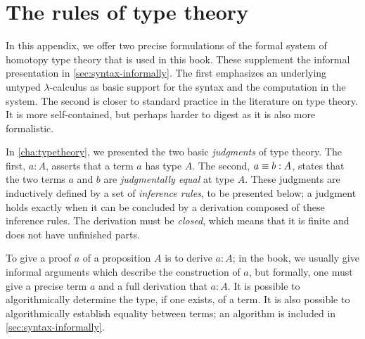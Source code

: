\chapter{The rules of type theory}
\label{cha:rules}


\newcommand{\emptyctx}{\ensuremath{\cdot}}
\newcommand{\production}{\vcentcolon\vcentcolon=}
\newcommand{\conv}{\sim}
\newcommand{\ctx}{\ensuremath{\mathsf{ctx}}}
\newcommand{\wfctx}[1]{\vdash #1\ \ctx}
\newcommand{\oftp}[3]{#1 \vdash #2 : #3}
\newcommand{\jdeqtp}[4]{#1 \vdash #2 \jdeq #3 : #4}
\newcommand{\judg}[2]{#1 \vdash #2}
\newcommand{\tmtp}[2]{#1 \mathord{:} #2}

\newcommand{\form}{\textsc{form}}
\newcommand{\intro}{\textsc{intro}}
\newcommand{\elim}{\textsc{elim}}
\newcommand{\comp}{\textsc{comp}}
\newcommand{\Weak}{\mathsf{Wkg}}
\newcommand{\Vble}{\mathsf{Vble}}
\newcommand{\Exch}{\mathsf{Exch}}
\newcommand{\Subst}{\mathsf{Subst}}

In this appendix, we offer two precise
formulations of the formal system of homotopy type theory that is used
in this book. These supplement the informal presentation in \autoref{sec:syntax-informally}.
The first emphasizes an underlying untyped $\lambda$-calculus as basic
support for the syntax and the computation in the system.
The second is closer to standard practice in the
literature on type theory. It is more self-contained, but perhaps
harder to digest as it is also more formalistic.

In \autoref{cha:typetheory}, we presented the two basic {\em judgments} of type
theory. The first, $a:A$, asserts that a term $a$ has type $A$.  The second,
$a\equiv b:A$, states that the two terms $a$ and $b$ are {\em judgmentally equal}
at type $A$. These judgments are inductively defined by a set of {\em inference
rules}, to be presented below; a judgment holds exactly when it can be concluded
by a derivation composed of these inference rules. The derivation must
be \emph{closed}, which means that it is finite and does not have unfinished parts.

To give a proof $a$ of a proposition $A$ is to derive $a:A$; in the book, we
usually give informal arguments which describe the construction of $a$, but
formally, one must give a precise term $a$ and a full derivation that $a:A$. It
is possible to algorithmically determine the type, if one exists, of a term. It is also
possible to algorithmically establish equality between terms; an algorithm is
included in \autoref{sec:syntax-informally}.

